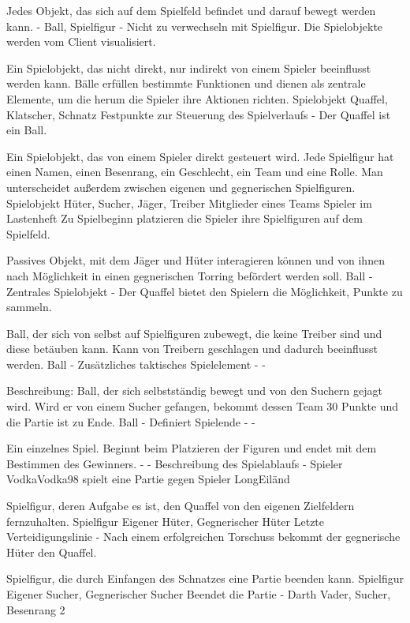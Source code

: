 {Jedes Objekt, das sich auf dem Spielfeld befindet und darauf bewegt werden kann.}
{-}
{Ball, Spielfigur}
{-}
{Nicht zu verwechseln mit Spielfigur.}
{Die Spielobjekte werden vom Client visualisiert.}

{Ein Spielobjekt, das nicht direkt, nur indirekt von einem Spieler beeinflusst werden kann. Bälle erfüllen bestimmte Funktionen und dienen als zentrale Elemente, um die herum die Spieler ihre Aktionen richten.}
{Spielobjekt}
{Quaffel, Klatscher, Schnatz}
{Festpunkte zur Steuerung des Spielverlaufs}
{-}
{Der Quaffel ist ein Ball.}

{Ein Spielobjekt, das von einem Spieler direkt gesteuert wird. Jede Spielfigur hat einen Namen, einen Besenrang, ein Geschlecht, ein Team und eine Rolle. Man unterscheidet außerdem zwischen eigenen und gegnerischen Spielfiguren.}
{Spielobjekt}
{Hüter, Sucher, Jäger, Treiber}
{Mitglieder eines Teams}
{Spieler im Lastenheft}
{Zu Spielbeginn platzieren die Spieler ihre Spielfiguren auf dem Spielfeld.}

{Passives Objekt, mit dem Jäger und Hüter interagieren können und von ihnen nach Möglichkeit in einen gegnerischen Torring befördert werden soll.}
{Ball}
{-}
{Zentrales Spielobjekt}
{-}
{Der Quaffel bietet den Spielern die Möglichkeit, Punkte zu sammeln.}

{Ball, der sich von selbst auf Spielfiguren zubewegt, die keine Treiber sind und diese betäuben kann. Kann von Treibern geschlagen und dadurch beeinflusst werden.}
{Ball}
{-}
{Zusätzliches taktisches Spielelement}
{-}
{-}

{Beschreibung: Ball, der sich selbstständig bewegt und von den Suchern gejagt wird. Wird er von einem Sucher gefangen, bekommt dessen Team 30 Punkte und die Partie ist zu Ende.}
{Ball}
{-}
{Definiert Spielende}
{-}
{-}

{Ein einzelnes Spiel. Beginnt beim Platzieren der Figuren und endet mit dem Bestimmen des Gewinners.}
{-}
{-}
{Beschreibung des Spielablaufs}
{-}
{Spieler VodkaVodka98 spielt eine Partie gegen Spieler LongEiländ}

{Spielfigur, deren Aufgabe es ist, den Quaffel von den eigenen Zielfeldern fernzuhalten.}
{Spielfigur}
{Eigener Hüter, Gegnerischer Hüter}
{Letzte Verteidigungslinie}
{-}
{Nach einem erfolgreichen Torschuss bekommt der gegnerische Hüter den Quaffel.}

{Spielfigur, die durch Einfangen des Schnatzes eine Partie beenden kann.}
{Spielfigur}
{Eigener Sucher, Gegnerischer Sucher}
{Beendet die Partie}
{-}
{Darth Vader, Sucher, Besenrang 2}

